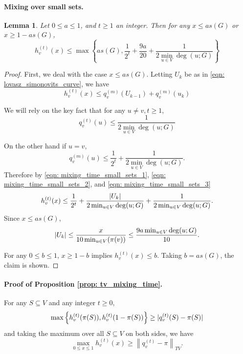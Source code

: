 \documentclass[11pt,twoside]{article}
\newtheorem{lemma}{Lemma}
\DeclarePairedDelimiter\abs{\lvert}{\rvert}
\newcommand{\set}[1]{\left\{#1\right\}}
\newcommand{\norm}[1]{\left\lVert#1\right\rVert}
\newcommand{\1}{\mathbf{1}}
\begin{document}
\paragraph{Mixing over small sets.}

\begin{lemma}
	\label{lem: mixing_time_small_sets}
	Let $0 \leq a \leq 1$, and $t \geq 1$ an integer. Then for any $x \leq as(G)$ or $x \geq 1 - as(G)$,
	\begin{equation*}
	h_v^{(t)}(x) \leq \max\set{as(G), \frac{1}{2^t} + \frac{9a}{20} + \frac{1}{2 \min_{u \in V}\deg(u;G)} }
	\end{equation*}
\end{lemma}
\begin{proof}
	First, we deal with the case $x \leq as(G)$. Letting $U_k$ be as in \eqref{eqn: lovasz_simonovits_curve}, we have
	\begin{equation}
	\label{eqn: mixing_time_small_sets_1}
	h_v^{(t)}(x) \leq q_v^{(m)}(U_{k - 1}) + q_v^{(m)}(u_k)
	\end{equation}
	
	We will rely on the key fact that for any $u \neq v, t \geq 1$,
	\begin{equation}
	\label{eqn: mixing_time_small_sets_2}
	q_v^{(t)}(u) \leq \frac{1}{2 \min_{u \in V}\deg(u;G)}
	\end{equation}
	
	On the other hand if $u = v$,
	\begin{equation}
	\label{eqn: mixing_time_small_sets_3}
	q_v^{(m)}(u) \leq \frac{1}{2^t} + \frac{1}{2\min_{u \in V}\deg(u;G)}.
	\end{equation}
	Therefore by \eqref{eqn: mixing_time_small_sets_1}, \eqref{eqn: mixing_time_small_sets_2}, and \eqref{eqn: mixing_time_small_sets_3}
	\begin{equation*}
	h_v^{(t)}(x) \leq \frac{1}{2^t} + \frac{\abs{U_k}}{2 \min_{u \in V}\deg(u;G)} + \frac{1}{2 \min_{u \in V}\deg(u;G)}.
	\end{equation*}
	Since $x \leq a s(G)$, 
	\begin{equation*}
	\abs{U_k} \leq \frac{x}{10 \min_{u \in V}(\pi(v))} \leq \frac{9a\min_{u \in V}\deg(u;G)}{10}.
	\end{equation*}
	
	For any $0 \leq b \leq 1$, $x \geq 1 - b$ implies $h_v^{(t)}(x) \leq b$. Taking $b = a s(G)$, the claim is shown.
\end{proof}

\paragraph{Proof of Proposition \ref{prop: tv_mixing_time}.}
For any $S \subseteq V$ and any integer $t \geq 0$,
\begin{equation*}
\max \set{h_v^{(t)}(\pi(S)), h_v^{(t)}(1 - \pi(S))} \geq \abs{q_v^{(t)}(S) - \pi(S)}
\end{equation*}
and taking the maximum over all $S \subseteq V$ on both sides, we have
\begin{equation*}
\max_{0 \leq x \leq 1} h_v^{(t)}(x) \geq \norm{q_v^{(t)} - \pi}_{TV}.
\end{equation*}
\end{document}
